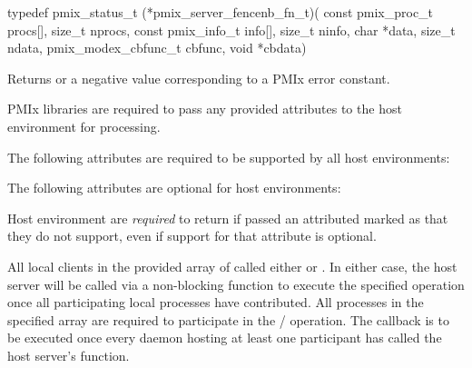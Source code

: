 \format

\cspecificstart
\begin{codepar}
typedef pmix_status_t (*pmix_server_fencenb_fn_t)(
                             const pmix_proc_t procs[],
                             size_t nprocs,
                             const pmix_info_t info[],
                             size_t ninfo,
                             char *data, size_t ndata,
                             pmix_modex_cbfunc_t cbfunc,
                             void *cbdata)
\end{codepar}
\cspecificend

\begin{arglist}
\end{arglist}

Returns  or a negative value corresponding to a PMIx error constant.

\reqattrstart
\ac{PMIx} libraries are required to pass any provided attributes to the host environment for processing.

The following attributes are required to be supported by all host environments:


\reqattrend

\optattrstart
The following attributes are optional for host environments:


\optattrend

\advicermstart
Host environment are \textit{required} to return  if passed an attributed marked as  that they do not support, even if support for that attribute is optional.
\advicermend

\descr

All local clients in the provided array of  called either  or .
In either case, the host server will be called via a non-blocking function to execute the specified operation once all participating local processes have contributed.
All processes in the specified  array are required to participate in the / operation.
The callback is to be executed once every daemon hosting at least one participant has called the host server's  function.


